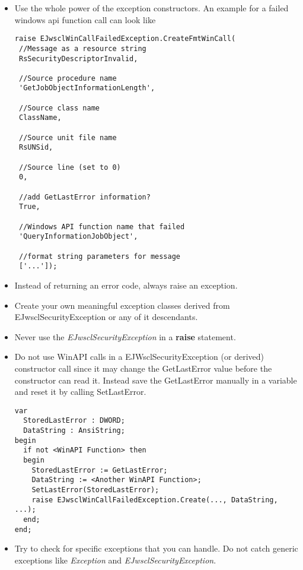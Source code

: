\documentclass[a4paper,twoside,10pt]{report}
\begin{document}
\begin{itemize}
	\item Use the whole power of the exception constructors. An example for a failed windows api function call can look like
\begin{lstlisting}
raise EJwsclWinCallFailedException.CreateFmtWinCall(
 //Message as a resource string
 RsSecurityDescriptorInvalid,          
 
 //Source procedure name
 'GetJobObjectInformationLength',      
 
 //Source class name
 ClassName,                            
 
 //Source unit file name
 RsUNSid,                              
 
 //Source line (set to 0)
 0,                                    
 
 //add GetLastError information?
 True,                                 
 
 //Windows API function name that failed
 'QueryInformationJobObject',          
 
 //format string parameters for message
 ['...']);
\end{lstlisting}            
  \item Instead of returning an error code, always raise an exception.
  \item Create your own meaningful exception classes derived from EJwsclSecurityException or any of it descendants.
  \item Never use the \textit{EJwsclSecurityException} in a \textbf{raise} statement.
  \item Do not use WinAPI calls in a EJWsclSecurityException (or derived) constructor call since it may change the GetLastError value before the constructor can read it. Instead save the GetLastError manually in a variable and reset it by calling SetLastError.
\begin{lstlisting}  
var 
  StoredLastError : DWORD;
  DataString : AnsiString;
begin
  if not <WinAPI Function> then
  begin
    StoredLastError := GetLastError;
    DataString := <Another WinAPI Function>;
    SetLastError(StoredLastError);
    raise EJwsclWinCallFailedException.Create(..., DataString, ...);
  end;
end;
\end{lstlisting}

  \item Try to check for specific exceptions that you can handle. Do not catch generic
exceptions like \textit{Exception} and \textit{EJwsclSecurityException}.

\end{itemize}
\end{document}
